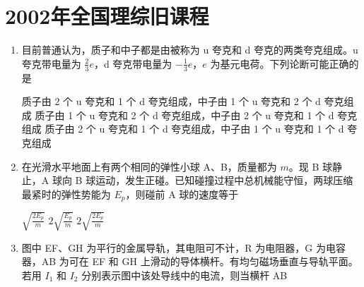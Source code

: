 \documentclass[\gkver]{gaokaozhenti}
\begin{document}
\chapter{2002年全国理综旧课程}

\begin{enumerate}
\item
目前普通认为，质子和中子都是由被称为 u 夸克和 d 夸克的两类夸克组成。u 夸克带电量为 $\frac{2}{3}e$，d 夸克带电量为 $-\frac{1}{3}e$，$e$ 为基元电荷。下列论断可能正确的是

{质子由 2 个 u 夸克和 1 个 d 夸克组成，中子由 1 个 u 夸克和 2 个 d 夸克组成}
{质子由 1 个 u 夸克和 2 个 d 夸克组成，中子由 2 个 u 夸克和 1 个 d 夸克组成}
{质子由 2 个 u 夸克和 1 个 d 夸克组成，中子由 1 个 u 夸克和 1 个 d 夸克组成}


\item
在光滑水平地面上有两个相同的弹性小球 A、B，质量都为 $m$。现 B 球静止，A 球向 B 球运动，发生正碰。已知碰撞过程中总机械能守恒，两球压缩最紧时的弹性势能为 $E_{p}$，则碰前 A 球的速度等于

{$\sqrt{\frac{2E_{p}}{m}}$}
{$2\sqrt{\frac{E_{p}}{m}}$}
{$2\sqrt{\frac{2E_{p}}{m}}$}


\item
图中 EF、GH 为平行的金属导轨，其电阻可不计，R 为电阻器，G 为电容器，AB 为可在 EF 和 GH 上滑动的导体横杆。有均匀磁场垂直与导轨平面。若用 $I_{1}$ 和 $I_{2}$ 分别表示图中该处导线中的电流，则当横杆 AB


\end{enumerate}
\end{document}
